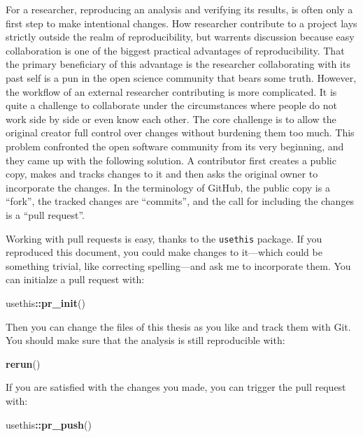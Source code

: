 \documentclass[12pt,a4paper,]{article}
\newenvironment{Shaded}{\begin{snugshade}}{\end{snugshade}}
\newcommand{\KeywordTok}[1]{\textcolor[rgb]{0.13,0.29,0.53}{\textbf{#1}}}
\newcommand{\NormalTok}[1]{#1}
\newcommand{\OperatorTok}[1]{\textcolor[rgb]{0.81,0.36,0.00}{\textbf{#1}}}
\begin{document}
For a researcher, reproducing an analysis and verifying its results, is often only a first step to make intentional changes.
How researcher contribute to a project lays strictly outside the realm of reproducibility, but warrents discussion because easy collaboration is one of the biggest practical advantages of reproducibility.
That the primary beneficiary of this advantage is the researcher collaborating with its past self is a pun in the open science community that bears some truth.
However, the workflow of an external researcher contributing is more complicated.
It is quite a challenge to collaborate under the circumstances where people do not work side by side or even know each other.
The core challenge is to allow the original creator full control over changes without burdening them too much.
This problem confronted the open software community from its very beginning, and they came up with the following solution.
A contributor first creates a public copy, makes and tracks changes to it and then asks the original owner to incorporate the changes.
In the terminology of GitHub, the public copy is a ``fork'', the tracked changes are ``commits'', and the call for including the changes is a ``pull request''.

Working with pull requests is easy, thanks to the \texttt{usethis} package.
If you reproduced this document, you could make changes to it---which could be something trivial, like correcting spelling---and ask me to incorporate them.
You can initialze a pull request with:

\begin{Shaded}
\begin{Highlighting}[]
\NormalTok{usethis}\OperatorTok{::}\KeywordTok{pr_init}\NormalTok{()}
\end{Highlighting}
\end{Shaded}

Then you can change the files of this thesis as you like and track them with Git.
You should make sure that the analysis is still reproducible with:

\begin{Shaded}
\begin{Highlighting}[]
\KeywordTok{rerun}\NormalTok{()}
\end{Highlighting}
\end{Shaded}

If you are satisfied with the changes you made, you can trigger the pull request with:

\begin{Shaded}
\begin{Highlighting}[]
\NormalTok{usethis}\OperatorTok{::}\KeywordTok{pr_push}\NormalTok{()}
\end{Highlighting}
\end{Shaded}
\end{document}
